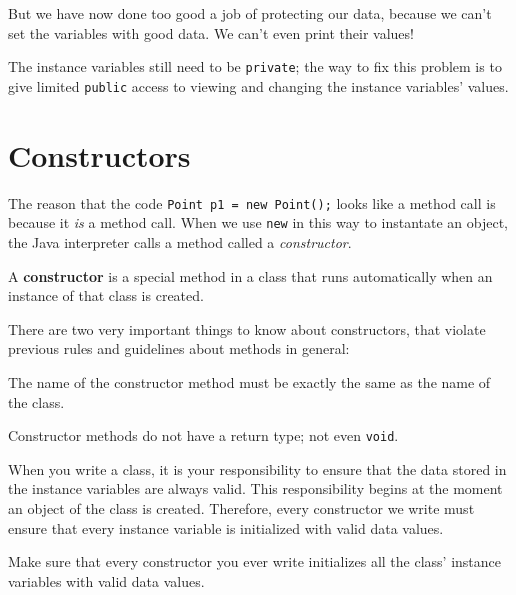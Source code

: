 But we have now done too good a job of protecting our data, because we can't set the variables with good data.  We can't even print their values!
%
%

The instance variables still need to be \texttt{private}; the way to fix this problem is to give limited \texttt{public} access to viewing and changing the instance variables' values.

\section{Constructors}

The reason that the code \texttt{Point p1 = new Point();} looks like a method call is because it \textit{is} a method call.  When we use \texttt{new} in this way to instantate an object, the Java interpreter calls a method called a \textit{constructor}.

    A \textbf{constructor} is a special method in a class that runs automatically when an instance of that class is created.

There are two very important things to know about constructors, that violate previous rules and guidelines about methods in general:
\bi
\item The name of the constructor method must be exactly the same as the name of the class.
\item Constructor methods do not have a return type; not even \texttt{void}.
\ei

When you write a class, it is your responsibility to ensure that the data stored in the instance variables are always valid.  This responsibility begins at the moment an object of the class is created.  Therefore, every constructor we write must ensure that every instance variable is initialized with valid data values.

    Make sure that every constructor you ever write initializes all the class' instance variables with valid data values.

